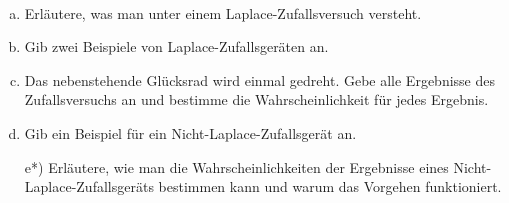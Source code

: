 \begin{aufgabe} ~ \\
\begin{enumerate}[a)] 
\item Erläutere, was man unter einem Laplace-Zufallsversuch versteht.
\item Gib zwei Beispiele von Laplace-Zufallsgeräten an.
\item Das nebenstehende Glücksrad wird einmal gedreht. Gebe alle Ergebnisse des Zufallsversuchs an und bestimme die Wahrscheinlichkeit für jedes Ergebnis.
\item Gib ein Beispiel für ein Nicht-Laplace-Zufallsgerät an.
\item[e*)] Erläutere, wie man die Wahrscheinlichkeiten der Ergebnisse eines Nicht-Laplace-Zufallsgeräts bestimmen kann und warum das Vorgehen funktioniert.  
\end{enumerate}
\end{aufgabe} 
